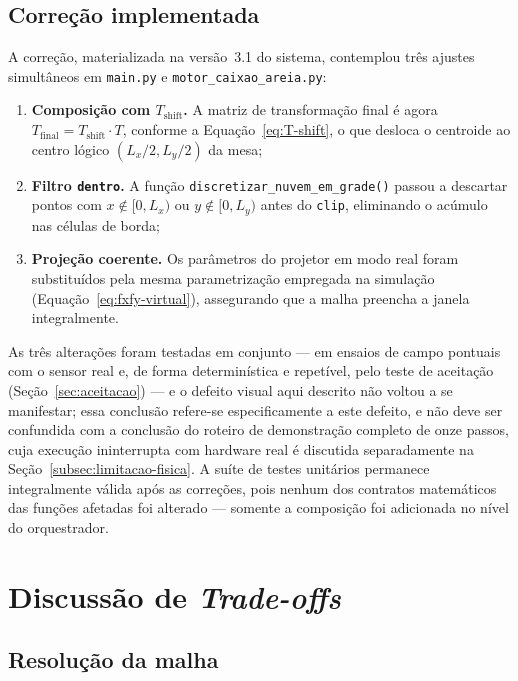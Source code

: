 \subsection{Correção implementada}

A correção, materializada na versão~3.1 do sistema, contemplou três
ajustes simultâneos em \texttt{main.py} e \texttt{motor\_caixao\_areia.py}:

\begin{enumerate}
    \item \textbf{Composição com $T_{\text{shift}}$.} A matriz de
          transformação final é agora $T_{\text{final}} = T_{\text{shift}}
          \cdot T$, conforme a Equação~\eqref{eq:T-shift}, o que desloca
          o centroide ao centro lógico $(L_x/2, L_y/2)$ da mesa;
    \item \textbf{Filtro \texttt{dentro}.} A função
          \texttt{discretizar\_nuvem\_em\_grade()} passou a descartar
          pontos com $x \notin [0, L_x)$ ou $y \notin [0, L_y)$ antes do
          \texttt{clip}, eliminando o acúmulo nas células de borda;
    \item \textbf{Projeção coerente.} Os parâmetros do projetor
          em modo real foram substituídos pela mesma parametrização
          empregada na simulação (Equação~\eqref{eq:fxfy-virtual}),
          assegurando que a malha preencha a janela integralmente.
\end{enumerate}

\noindent As três alterações foram testadas em conjunto — em ensaios
de campo pontuais com o sensor real e, de forma determinística e
repetível, pelo teste de aceitação (Seção~\ref{sec:aceitacao}) — e o
defeito visual aqui descrito não voltou a se manifestar; essa
conclusão refere-se especificamente a este defeito, e não deve ser
confundida com a conclusão do roteiro de demonstração completo de
onze passos, cuja execução ininterrupta com hardware real é discutida
separadamente na Seção~\ref{subsec:limitacao-fisica}. A suíte de testes unitários permanece
integralmente válida após as correções, pois nenhum dos contratos
matemáticos das funções afetadas foi alterado — somente a composição
foi adicionada no nível do orquestrador.

\section{Discussão de \emph{Trade-offs}}
\label{sec:tradeoffs}

\subsection{Resolução da malha}

